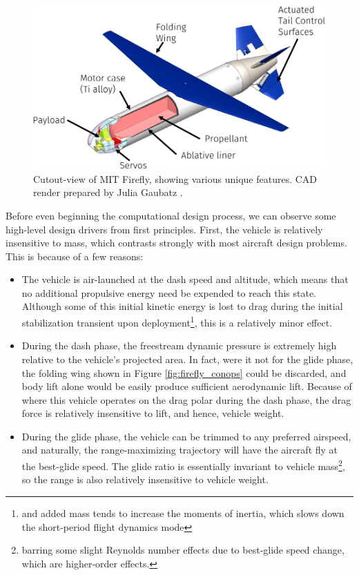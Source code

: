 \begin{figure}[H]
    \centering
    \includegraphics[width=\textwidth]{../figures/firefly_cutout-crop.pdf}
    \caption{Cutout-view of MIT Firefly, showing various unique features. CAD render prepared by Julia Gaubatz \cite{gaubatz_design_2024}.}
    \label{fig:firefly_cutout}
\end{figure}

Before even beginning the computational design process, we can observe some high-level design drivers from first principles. First, the vehicle is relatively insensitive to mass, which contrasts strongly with most aircraft design problems. This is because of a few reasons:
\begin{itemize}[noitemsep]
    \item The vehicle is air-launched at the dash speed and altitude, which means that no additional propulsive energy need be expended to reach this state. Although some of this initial kinetic energy is lost to drag during the initial stabilization transient upon deployment\footnote{and added mass tends to increase the moments of inertia, which slows down the short-period flight dynamics mode}, this is a relatively minor effect.
    \item During the dash phase, the freestream dynamic pressure is extremely high relative to the vehicle's projected area. In fact, were it not for the glide phase, the folding wing shown in Figure \ref{fig:firefly_conops} could be discarded, and body lift alone would be easily produce sufficient aerodynamic lift. Because of where this vehicle operates on the drag polar during the dash phase, the drag force is relatively insensitive to lift, and hence, vehicle weight.
    \item During the glide phase, the vehicle can be trimmed to any preferred airspeed, and naturally, the range-maximizing trajectory will have the aircraft fly at the best-glide speed. The glide ratio is essentially invariant to vehicle mass\footnote{barring some slight Reynolds number effects due to best-glide speed change, which are higher-order effects.}, so the range is also relatively insensitive to vehicle weight.
\end{itemize}

